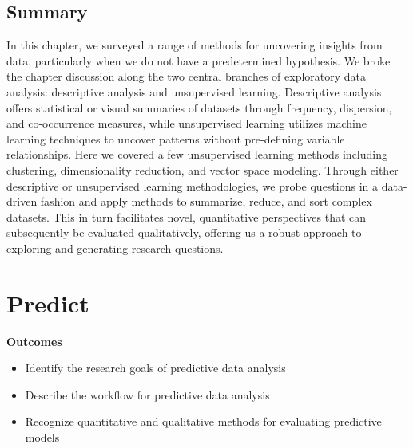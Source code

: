 \documentclass[
  letterpaper,
  krantz1]{latex/krantz-mod}
\providecommand{\tightlist}{%
  \setlength{\itemsep}{0pt}\setlength{\parskip}{0pt}}\usepackage{longtable,booktabs,array}
\newcommand{\setDOI}[1]{%
  \gdef\doi{%
    \footnotesize%
    #1\par%
    This chapter has been made available under a CC-BY-NC-ND license.%
  }%
}
\theoremstyle{definition}
\theoremstyle{definition}
\theoremstyle{remark}
\begin{document}
\section*{Summary}\label{summary-7}


In this chapter, we surveyed a range of methods for uncovering insights
from data, particularly when we do not have a predetermined hypothesis.
We broke the chapter discussion along the two central branches of
exploratory data analysis: descriptive analysis and unsupervised
learning. Descriptive analysis offers statistical or visual summaries of
datasets through frequency, dispersion, and co-occurrence measures,
while unsupervised learning utilizes machine learning techniques to
uncover patterns without pre-defining variable relationships. Here we
covered a few unsupervised learning methods including clustering,
dimensionality reduction, and vector space modeling. Through either
descriptive or unsupervised learning methodologies, we probe questions
in a data-driven fashion and apply methods to summarize, reduce, and
sort complex datasets. This in turn facilitates novel, quantitative
perspectives that can subsequently be evaluated qualitatively, offering
us a robust approach to exploring and generating research questions.

\chapter{Predict}\label{sec-predict-chapter}

\setDOI{10.4324/9781003393764.9}
\thispagestyle{chapterfirstpage}

\begin{tcolorbox}[enhanced jigsaw, toprule=.15mm, breakable, colback=white, arc=.35mm, left=2mm, colframe=quarto-callout-color-frame, opacityback=0, bottomrule=.15mm, rightrule=.15mm, leftrule=.75mm]

\textbf{ Outcomes}

\begin{itemize}
\tightlist
\item
  Identify the research goals of predictive data analysis
\item
  Describe the workflow for predictive data analysis
\item
  Recognize quantitative and qualitative methods for evaluating
  predictive models
\end{itemize}

\end{tcolorbox}
\end{document}
